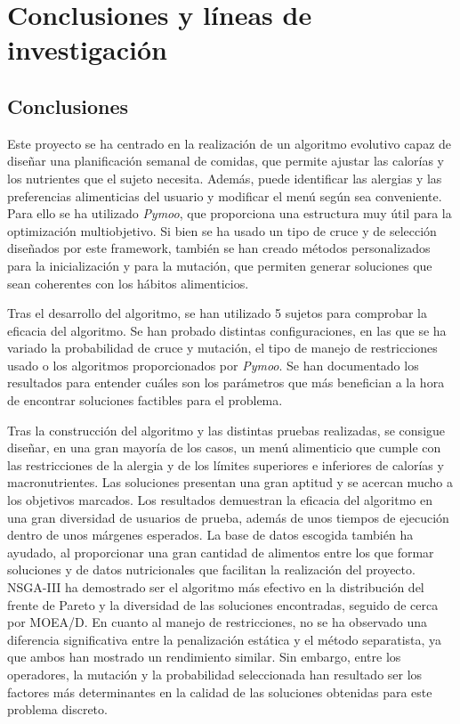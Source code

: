 \chapter{Conclusiones y líneas de investigación}
\label{ch:conclusiones}

\section{Conclusiones}
Este proyecto se ha centrado en la realización de un algoritmo evolutivo capaz de diseñar una planificación semanal de comidas, que permite ajustar las calorías y los nutrientes que el sujeto necesita. Además, puede identificar las alergias y las preferencias alimenticias del usuario y modificar el menú según sea conveniente. Para ello se ha utilizado \textit{Pymoo}, que proporciona una estructura muy útil para la optimización multiobjetivo. Si bien se ha usado un tipo de cruce y de selección diseñados por este framework, también se han creado métodos personalizados para la inicialización y para la mutación, que permiten generar soluciones que sean coherentes con los hábitos alimenticios.

Tras el desarrollo del algoritmo, se han utilizado 5 sujetos para comprobar la eficacia del algoritmo. Se han probado distintas configuraciones, en las que se ha variado la probabilidad de cruce y mutación, el tipo de manejo de restricciones usado o los algoritmos proporcionados por \textit{Pymoo}. Se han documentado los resultados para entender cuáles son los parámetros que más benefician a la hora de encontrar soluciones factibles para el problema.

Tras la construcción del algoritmo y las distintas pruebas realizadas, se consigue diseñar, en una gran mayoría de los casos, un menú alimenticio que cumple con las restricciones de la alergia y de los límites superiores e inferiores de calorías y macronutrientes. Las soluciones presentan una gran aptitud y se acercan mucho a los objetivos marcados. Los resultados demuestran la eficacia del algoritmo en una gran diversidad de usuarios de prueba, además de unos tiempos de ejecución dentro de unos márgenes esperados. La base de datos escogida también ha ayudado, al proporcionar una gran cantidad de alimentos entre los que formar soluciones y de datos nutricionales que facilitan la realización del proyecto.
\newpage
NSGA-III ha demostrado ser el algoritmo más efectivo en la distribución del frente de Pareto y la diversidad de las soluciones encontradas, seguido de cerca por MOEA/D. En cuanto al manejo de restricciones, no se ha observado una diferencia significativa entre la penalización estática y el método separatista, ya que ambos han mostrado un rendimiento similar. Sin embargo, entre los operadores, la mutación y la probabilidad seleccionada han resultado ser los factores más determinantes en la calidad de las soluciones obtenidas para este problema discreto.

